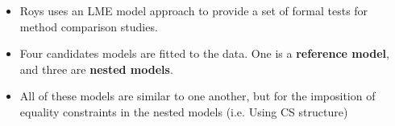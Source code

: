 \documentclass[compress]{beamer}        %
\begin{document}
		\begin{frame}
			\large
			\begin{itemize}\itemsep0.3cm
				
				\item Roys uses an LME model approach to provide a set of formal tests for method comparison studies.\\
				
				\item Four candidates models are fitted to the data. One is a \textbf{reference model}, and three are \textbf{nested models}.
				
				\item 
				All of these models are similar to one another, but for the imposition of equality constraints in the nested models (i.e. Using CS structure)
				
				
				
			\end{itemize}
		\end{frame}
\end{document}
